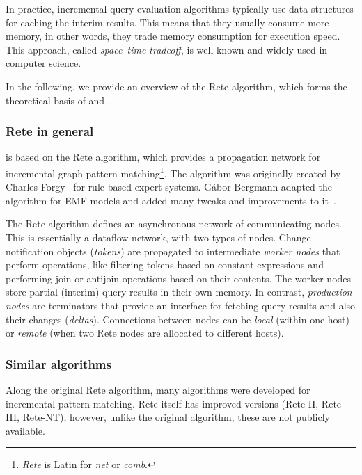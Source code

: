 In practice, incremental query evaluation algorithms typically use data structures for caching the interim results. This  means that they usually consume more memory, in other words, they trade memory consumption for execution speed. This approach, called \emph{space--time tradeoff}, is well-known and widely used in computer science.

In the following, we provide an overview of the Rete algorithm, which forms the theoretical basis of \eiq{} and \iqd{}.

\subsubsection{Rete in general}

\iqd{} is based on the Rete algorithm, which provides a propagation network for incremental graph pattern matching\footnote{\emph{Rete} is Latin for \emph{net} or \emph{comb}.}. The algorithm was originally created by Charles Forgy~\cite{Forgy} for rule-based expert systems. Gábor Bergmann adapted the algorithm for EMF models and added many tweaks and improvements to it~\cite{BergmannRete}.


The Rete algorithm defines an asynchronous network of communicating nodes. This is essentially a dataflow network, with two types of nodes. Change notification objects (\emph{tokens}) are propagated to intermediate \emph{worker nodes} that perform operations, like filtering tokens based on constant expressions and performing join or antijoin operations based on their contents. The worker nodes store partial (interim) query results in their own memory. In contrast, \emph{production nodes} are terminators that provide an interface for fetching query results and also their changes (\emph{deltas}). Connections between nodes can be \emph{local} (within one host) or \emph{remote} (when two Rete nodes are allocated to different hosts).

\subsubsection{Similar algorithms}

Along the original Rete algorithm, many algorithms were developed for incremental pattern matching. Rete itself has improved versions (Rete II, Rete III, Rete-NT), however, unlike the original algorithm, these are not publicly available. 

